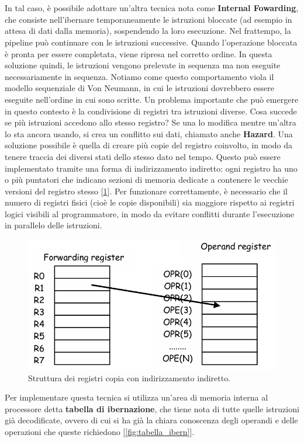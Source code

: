 \\
\\
In tal caso, è possibile adottare un'altra tecnica nota come \textbf{Internal Fowarding}, che consiste nell'ibernare temporaneamente le istruzioni bloccate (ad esempio in attesa di dati dalla memoria), sospendendo la loro esecuzione. Nel frattempo, la pipeline può continuare con le istruzioni successive. Quando l'operazione bloccata è pronta per essere completata, viene ripresa nel corretto ordine. In questa soluzione quindi, le istruzioni vengono prelevate in sequenza ma non eseguite necessariamente in sequenza. Notiamo come questo comportamento viola il modello sequenziale di Von Neumann, in cui le istruzioni dovrebbero essere eseguite nell'ordine in cui sono scritte. Un problema importante che può emergere in questo contesto è la condivisione di registri tra istruzioni diverse. Cosa succede se più istruzioni accedono allo stesso registro? Se una lo modifica mentre un'altra lo sta ancora usando, si crea un conflitto sui dati, chiamato anche \textbf{Hazard}.  Una soluzione possibile è quella di creare più copie del registro coinvolto, in modo da tenere traccia dei diversi stati dello stesso dato nel tempo. Questo può essere implementato tramite una forma di indirizzamento indiretto: ogni registro ha uno o più puntatori che indicano sezioni di memoria dedicate a contenere le vecchie versioni del registro stesso [\ref{fig:reg_copia}]. Per funzionare correttamente, è necessario che il numero di registri fisici (cioè le copie disponibili) sia maggiore rispetto ai registri logici visibili al programmatore, in modo da evitare conflitti durante l'esecuzione in parallelo delle istruzioni.
\begin{figure}[ht]
    \centering
    \includegraphics[width=0.4\linewidth]{img/registri_copia1.png}
    \caption{Struttura dei registri copia con indirizzamento indiretto.}
    \label{fig:reg_copia}
\end{figure}
Per implementare questa tecnica si utilizza un'area di memoria interna al processore detta \textbf{tabella di ibernazione}, che tiene nota di tutte quelle istruzioni già decodificate, ovvero di cui si ha già la chiara conoscenza degli operandi e delle operazioni che queste richiedono [\ref{fig:tabella_ibern}]. 
